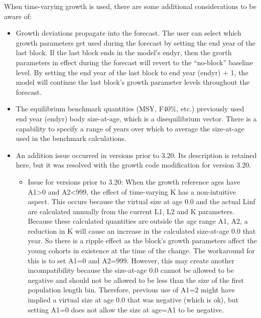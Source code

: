 When time-varying growth is used, there are some additional considerations to be aware of:
\begin{itemize}
	\item Growth deviations propagate into the forecast.  The user can select which growth parameters get used during the forecast by setting the end year of the last block.  If the last block ends in the model’s endyr, then the grorth parameters in effect during the forecast will revert to the “no-block” baseline level.  By setting the end year of the last block to end year (endyr) + 1, the model will continue the last block’s growth parameter levels throughout the forecast.
	\item The equilibrium benchmark quantities (MSY, F40\%, etc.) previously used end year (endyr) body size-at-age, which is a disequilibrium vector.  There is a capability to specify a range of years over which to average the size-at-age used in the benchmark calculations.
	\item An addition issue occurred in versions prior to 3.20.  Its description is retained here, but it was resolved with the growth code modification for version 3.20.
	\begin{itemize}
		\item Issue for versions prior to 3.20:  When the growth reference ages have A1>0 and A2<999, the effect of time-varying K has a non-intuitive aspect.  This occurs because the virtual size at age 0.0 and the actual Linf are calculated annually from the current L1, L2 and K parameters.  Because  these calculated quantities are outside the age range {A1, A2}, a reduction in K will cause an increase in the calculated size-at-age 0.0 that year.  So there is a ripple effect as the block’s  growth parameters affect the young cohorts in existence at the time of the change.  The workaround for this is to set A1=0 and A2=999.  However, this may create another incompatibility because the size-at-age 0.0 cannot be allowed to be negative and should not be allowed to be less than the size of the first population length bin.  Therefore, previous use of A1=2 might have implied a virtual size at age 0.0 that was negative (which is ok), but setting A1=0 does not allow the size at age=A1 to be negative.
	\end{itemize}
\end{itemize}

